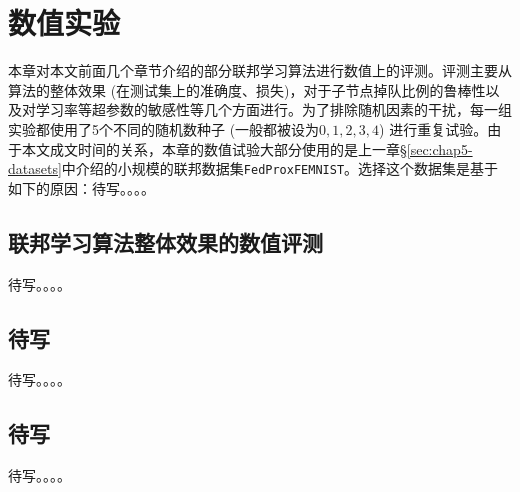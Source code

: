 \chapter{\hspace{-1mm}\bf 数值实验}
\label{chap6}


本章对本文前面几个章节介绍的部分联邦学习算法进行数值上的评测。评测主要从算法的整体效果 (在测试集上的准确度、损失)，对于子节点掉队比例的鲁棒性以及对学习率等超参数的敏感性等几个方面进行。为了排除随机因素的干扰，每一组实验都使用了5个不同的随机数种子 (一般都被设为$0, 1, 2, 3, 4$) 进行重复试验。由于本文成文时间的关系，本章的数值试验大部分使用的是上一章\S\ref{sec:chap5-datasets}中介绍的小规模的联邦数据集\texttt{FedProxFEMNIST}。选择这个数据集是基于如下的原因：待写。。。。


\section{联邦学习算法整体效果的数值评测}
\label{sec:chap6-overall}


待写。。。。

\section{待写}


待写。。。。

\section{待写}


待写。。。。
